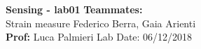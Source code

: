\noindent
\large\textbf{Sensing - lab01} \hfill \textbf{Teammates:} \\
\normalsize Strain measure \hfill  Federico Berra, Gaia Arienti\\
\textbf{Prof:} Luca Palmieri \hfill Lab Date: 06/12/2018
